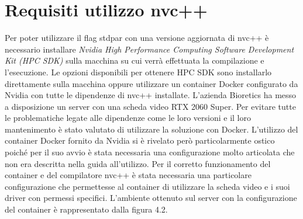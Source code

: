 \documentclass[12pt,a4paper]{report}
\begin{document}
\section{Requisiti utilizzo nvc++}
Per poter utilizzare il flag stdpar con una versione aggiornata di nvc++ è necessario installare \textit{Nvidia High Performance Computing Software Development Kit (HPC SDK)} sulla macchina su cui verrà effettuata la compilazione e l'esecuzione. Le opzioni disponibili per ottenere HPC SDK sono installarlo direttamente sulla macchina oppure utilizzare un container Docker configurato da Nvidia con tutte le dipendenze di nvc++ installate. \newline
L'azienda Bioretics ha messo a disposizione un server con una scheda video RTX 2060 Super. Per evitare tutte le problematiche legate alle dipendenze come le loro versioni e il loro mantenimento è stato valutato di utilizzare la soluzione con Docker. \newline
L'utilizzo del container Docker fornito da Nvidia si è rivelato però particolarmente ostico poiché per il suo avvio è stata necessaria una configurazione molto articolata che non era descritta nella guida all'utilizzo. Per il corretto funzionamento del container e del compilatore nvc++ è stata necessaria una particolare configurazione che permettesse al container di utilizzare la scheda video e i suoi driver con permessi specifici. 
L'ambiente ottenuto sul server con la configurazione del container è rappresentato dalla figura 4.2.

\begin{figure}[H]
\centering
\begin{floatrow}[1]
\end{floatrow}
\end{figure} \newpage
\end{document}
